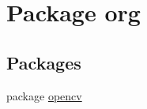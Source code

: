 \hypertarget{namespaceorg}{}\section{Package org}
\label{namespaceorg}
\subsection*{Packages}
\begin{DoxyCompactItemize}
\item 
package \mbox{\hyperlink{namespaceorg_1_1opencv}{opencv}}
\end{DoxyCompactItemize}
